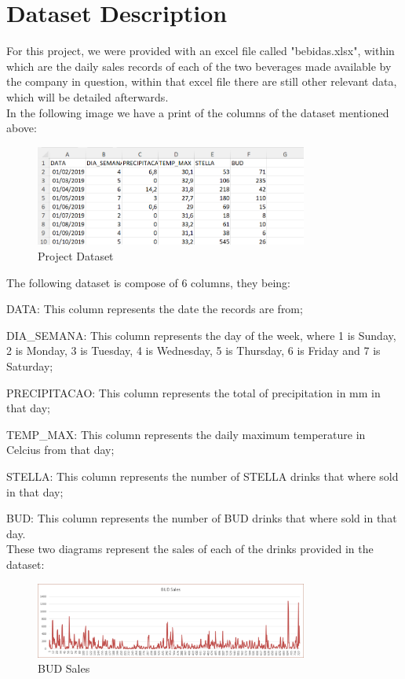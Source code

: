 \newpage

\section{Dataset Description}

\quad For this project, we were provided with an excel file called "bebidas.xlsx", within which are the daily sales records of each of the two beverages made available by the company in question, within that excel file there are still other relevant data, which will be detailed afterwards. \\

In the following image we have a print of the columns of the dataset mentioned above:

\begin{figure}[H]
    \centering
    \includegraphics[width=0.8\textwidth]{assets/dataset.png}
    \caption{Project Dataset}
    \label{fig:dataset}
    \end{figure}


The following dataset is compose of 6 columns, they being:

\quad \textbullet DATA: This column represents the date the records are from;

\quad \textbullet DIA\_SEMANA: This column represents the day of the week, where 1 is Sunday, 2 is Monday, 3 is Tuesday, 4 is Wednesday, 5 is Thursday, 6 is Friday and 7 is Saturday;

\quad \textbullet PRECIPITACAO: This column represents the total of precipitation in mm in that day;

\quad \textbullet TEMP\_MAX: This column represents the daily maximum temperature in Celcius from that day;

\quad \textbullet STELLA: This column represents the number of STELLA drinks that where sold in that day;

\quad \textbullet BUD: This column represents the number of BUD drinks that where sold in that day.\\


These  two diagrams represent the sales of each of the drinks provided in the dataset:
\\
\begin{figure}[H]
    \centering
    \includegraphics[width=0.8\textwidth]{assets/BUD.png}
    \caption{BUD Sales}
    \label{fig:bud_sales}
    \end{figure}

